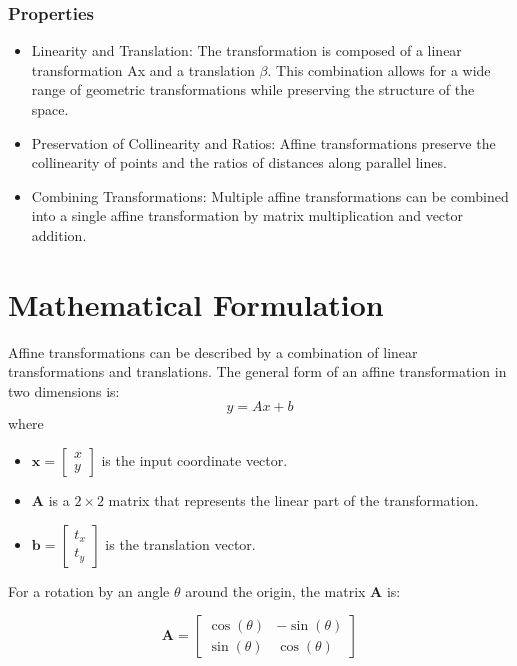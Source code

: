 \documentclass[conference]{IEEEtran}
\begin{document}
\subsubsection{Properties}
\begin{itemize}
  \item Linearity and Translation:  The transformation is composed of a linear transformation  Ax and a translation $\beta$.  This combination allows for a wide range of geometric transformations while preserving the structure of the space.

  \item Preservation of Collinearity and Ratios:  Affine transformations preserve the collinearity of points and the ratios of distances along parallel lines.

  \item Combining Transformations:  Multiple affine transformations can be combined into a single affine transformation by matrix multiplication and vector addition.
\end{itemize}

\section*{Mathematical Formulation}
Affine transformations can be described by a combination of linear transformations and translations. The general form of an affine transformation in two dimensions is:
$$y = Ax + b$$
where
\begin{itemize}
    \item \(\mathbf{x} = \begin{bmatrix} x \\ y \end{bmatrix}\) is the input coordinate vector.\\
    \item \(\mathbf{A}\) is a \(2 \times 2\) matrix that represents the linear part of the transformation.\\
    \item \(\mathbf{b} = \begin{bmatrix} t_x \\ t_y \end{bmatrix}\) is the translation vector.\\
\end{itemize}

For a rotation by an angle \(\theta\) around the origin, the matrix \(\mathbf{A}\) is:

\[
\mathbf{A} = \begin{bmatrix} \cos(\theta) & -\sin(\theta) \\ \sin(\theta) & \cos(\theta) \end{bmatrix}
\]
\end{document}
